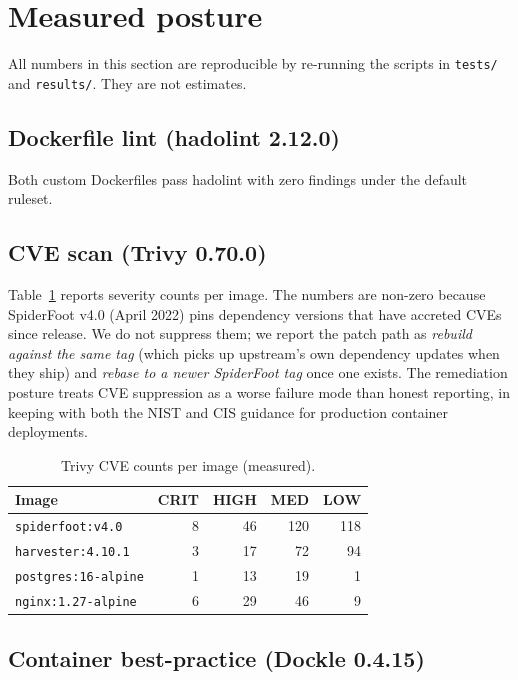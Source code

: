 \documentclass[conference,a4paper,10pt]{IEEEtran}
\begin{document}
\section{Measured posture}
\label{sec:measured}

All numbers in this section are reproducible by re-running the
scripts in \texttt{tests/} and \texttt{results/}. They are not
estimates.

\subsection{Dockerfile lint (hadolint 2.12.0)}

Both custom Dockerfiles pass hadolint with zero findings under the
default ruleset.

\subsection{CVE scan (Trivy 0.70.0)}

Table~\ref{tab:trivy} reports severity counts per image. The numbers
are non-zero because SpiderFoot v4.0 (April 2022) pins dependency
versions that have accreted CVEs since release. We do not suppress
them; we report the patch path as \emph{rebuild against the same tag}
(which picks up upstream's own dependency updates when they ship) and
\emph{rebase to a newer SpiderFoot tag} once one exists. The
remediation posture treats CVE suppression as a worse failure mode
than honest reporting, in keeping with both the NIST
\cite{nist800190} and CIS \cite{cisdocker} guidance for production
container deployments.

\begin{table}[!t]
\caption{Trivy CVE counts per image (measured).}
\label{tab:trivy}
\centering
\footnotesize
\begin{tabularx}{\columnwidth}{Xrrrr}
\toprule
\textbf{Image} & \textbf{CRIT} & \textbf{HIGH} & \textbf{MED} & \textbf{LOW} \\
\midrule
\texttt{spiderfoot:v4.0}    &  8 &  46 & 120 & 118 \\
\texttt{harvester:4.10.1}   &  3 &  17 &  72 &  94 \\
\texttt{postgres:16-alpine} &  1 &  13 &  19 &   1 \\
\texttt{nginx:1.27-alpine}  &  6 &  29 &  46 &   9 \\
\bottomrule
\end{tabularx}
\end{table}

\subsection{Container best-practice (Dockle 0.4.15)}
\end{document}
